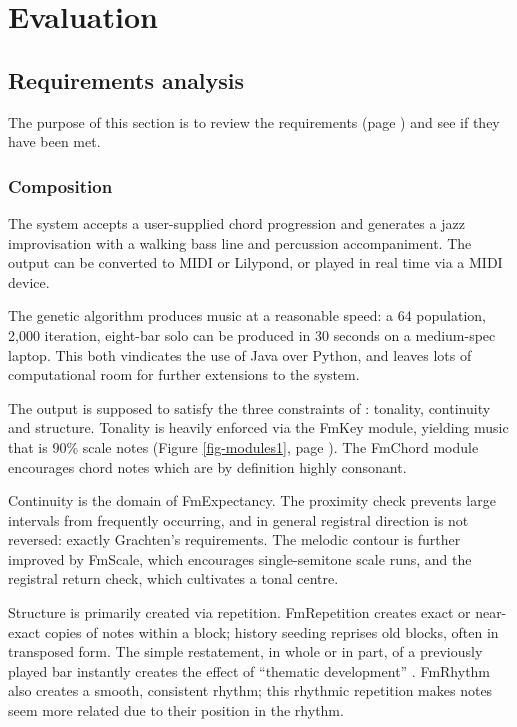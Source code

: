 \chapter{Evaluation}


\section{Requirements analysis}

The purpose of this section is to review the requirements (page \pageref{reqs}) and see if they have been met.

\subsection{Composition}

The system accepts a user-supplied chord progression and generates a jazz improvisation with a walking bass line and percussion accompaniment. The output can be converted to MIDI or Lilypond, or played in real time via a MIDI device.

The genetic algorithm produces music at a reasonable speed: a 64 population, 2,000 iteration, eight-bar solo can be produced in 30 seconds on a medium-spec laptop. This both vindicates the use of Java over Python, and leaves lots of computational room for further extensions to the system.

The output is supposed to satisfy the three constraints of \cite{grachten01}: tonality, continuity and structure. Tonality is heavily enforced via the FmKey module, yielding music that is 90\% scale notes (Figure \ref{fig-modules1}, page \pageref{fig-modules1}). The FmChord module encourages chord notes which are by definition highly consonant.

Continuity is the domain of FmExpectancy. The proximity check prevents large intervals from frequently occurring, and in general registral direction is not reversed: exactly Grachten's requirements. The melodic contour is further improved by FmScale, which encourages single-semitone scale runs, and the registral return check, which cultivates a tonal centre.

Structure is primarily created via repetition. FmRepetition creates exact or near-exact copies of notes within a block; history seeding reprises old blocks, often in transposed form. The simple restatement, in whole or in part, of a previously played bar instantly creates the effect of ``thematic development'' \citep{biles94}. FmRhythm also creates a smooth, consistent rhythm; this rhythmic repetition makes notes seem more related due to their position in the rhythm.

